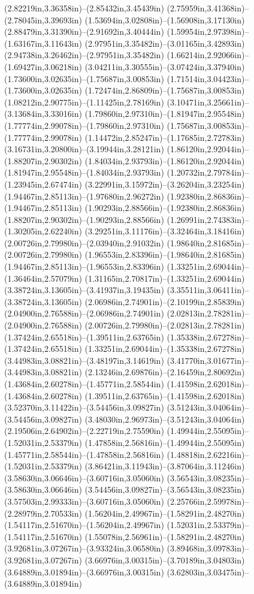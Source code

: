 (2.82219in,3.36358in)--(2.85432in,3.45439in) (2.75959in,3.41368in)--(2.78045in,3.39693in) (1.53694in,3.02808in)--(1.56908in,3.17130in) (2.88479in,3.31390in)--(2.91692in,3.40444in) (1.59954in,2.97398in)--(1.63167in,3.11643in) (2.97951in,3.35482in)--(3.01165in,3.42893in) (2.94738in,3.26462in)--(2.97951in,3.35482in) (1.66214in,2.92066in)--(1.69427in,3.06218in) (3.04211in,3.30555in)--(3.07424in,3.37940in) (1.73600in,3.02635in)--(1.75687in,3.00853in) (1.71514in,3.04423in)--(1.73600in,3.02635in) (1.72474in,2.86809in)--(1.75687in,3.00853in) (1.08212in,2.90775in)--(1.11425in,2.78169in) (3.10471in,3.25661in)--(3.13684in,3.33016in) (1.79860in,2.97310in)--(1.81947in,2.95548in) (1.77774in,2.99078in)--(1.79860in,2.97310in) (1.75687in,3.00853in)--(1.77774in,2.99078in) (1.14472in,2.85247in)--(1.17685in,2.72783in) (3.16731in,3.20800in)--(3.19944in,3.28121in) (1.86120in,2.92044in)--(1.88207in,2.90302in) (1.84034in,2.93793in)--(1.86120in,2.92044in) (1.81947in,2.95548in)--(1.84034in,2.93793in) (1.20732in,2.79784in)--(1.23945in,2.67474in) (3.22991in,3.15972in)--(3.26204in,3.23254in) (1.94467in,2.85113in)--(1.97680in,2.96272in) (1.92380in,2.86836in)--(1.94467in,2.85113in) (1.90293in,2.88566in)--(1.92380in,2.86836in) (1.88207in,2.90302in)--(1.90293in,2.88566in) (1.26991in,2.74383in)--(1.30205in,2.62240in) (3.29251in,3.11176in)--(3.32464in,3.18416in) (2.00726in,2.79980in)--(2.03940in,2.91032in) (1.98640in,2.81685in)--(2.00726in,2.79980in) (1.96553in,2.83396in)--(1.98640in,2.81685in) (1.94467in,2.85113in)--(1.96553in,2.83396in) (1.33251in,2.69044in)--(1.36464in,2.57079in) (1.31165in,2.70817in)--(1.33251in,2.69044in) (3.38724in,3.13605in)--(3.41937in,3.19435in) (3.35511in,3.06411in)--(3.38724in,3.13605in) (2.06986in,2.74901in)--(2.10199in,2.85839in) (2.04900in,2.76588in)--(2.06986in,2.74901in) (2.02813in,2.78281in)--(2.04900in,2.76588in) (2.00726in,2.79980in)--(2.02813in,2.78281in) (1.37424in,2.65518in)--(1.39511in,2.63765in) (1.35338in,2.67278in)--(1.37424in,2.65518in) (1.33251in,2.69044in)--(1.35338in,2.67278in) (3.44983in,3.08821in)--(3.48197in,3.14619in) (3.41770in,3.01677in)--(3.44983in,3.08821in) (2.13246in,2.69876in)--(2.16459in,2.80692in) (1.43684in,2.60278in)--(1.45771in,2.58544in) (1.41598in,2.62018in)--(1.43684in,2.60278in) (1.39511in,2.63765in)--(1.41598in,2.62018in) (3.52370in,3.11422in)--(3.54456in,3.09827in) (3.51243in,3.04064in)--(3.54456in,3.09827in) (3.48030in,2.96973in)--(3.51243in,3.04064in) (2.19506in,2.64902in)--(2.22719in,2.75590in) (1.49944in,2.55095in)--(1.52031in,2.53379in) (1.47858in,2.56816in)--(1.49944in,2.55095in) (1.45771in,2.58544in)--(1.47858in,2.56816in) (1.48818in,2.62216in)--(1.52031in,2.53379in) (3.86421in,3.11943in)--(3.87064in,3.11246in) (3.58630in,3.06646in)--(3.60716in,3.05060in) (3.56543in,3.08235in)--(3.58630in,3.06646in) (3.54456in,3.09827in)--(3.56543in,3.08235in) (3.57503in,2.99333in)--(3.60716in,3.05060in) (2.25766in,2.59978in)--(2.28979in,2.70533in) (1.56204in,2.49967in)--(1.58291in,2.48270in) (1.54117in,2.51670in)--(1.56204in,2.49967in) (1.52031in,2.53379in)--(1.54117in,2.51670in) (1.55078in,2.56961in)--(1.58291in,2.48270in) (3.92681in,3.07267in)--(3.93324in,3.06580in) (3.89468in,3.09783in)--(3.92681in,3.07267in) (3.66976in,3.00315in)--(3.70189in,3.04803in) (3.64889in,3.01894in)--(3.66976in,3.00315in) (3.62803in,3.03475in)--(3.64889in,3.01894in) 